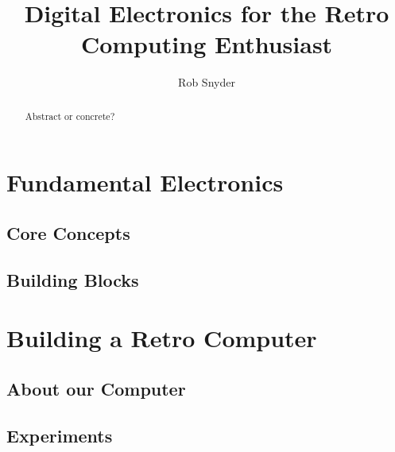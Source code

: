 \documentclass[10pt]{report}
\title{Digital Electronics for the Retro Computing Enthusiast}
\author{Rob Snyder}
\begin{document}
\maketitle

\begin{abstract}
Abstract or concrete?%
\end{abstract}

\tableofcontents

\part{Fundamental Electronics}

\chapter{Core Concepts}


\chapter{Building Blocks}


\part{Building a Retro Computer}

\chapter{About our Computer}


\chapter{Experiments}

\end{document}

